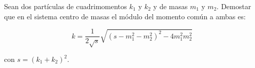 Sean dos partículas de cuadrimomentos $k_1$ y $k_2$ y de masas $m_1$ y $m_2$.  Demostar que en el sistema centro de masas el módulo del momento común a ambas es:

$$
k=\frac{1}{2 \sqrt{s}} \sqrt{\left(s-m_{1}^{2}-m_{2}^{2}\right)^{2}-4 m_{1}^{2} m_{2}^{2}}
$$

con $s=\left(k_{1}+k_{2}\right)^{2}$.

\begin{solution}\ \\

\end{solution}